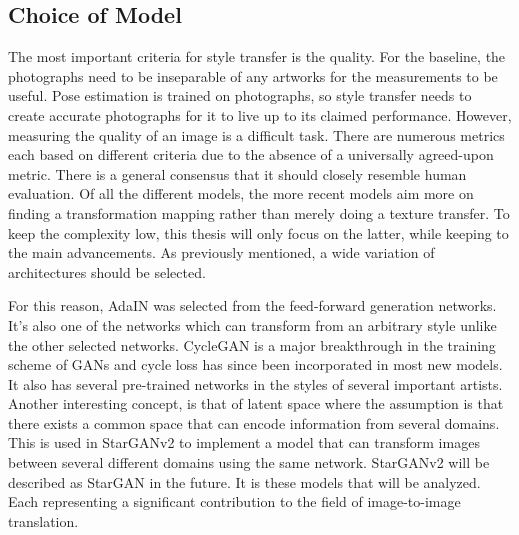 \subsection{Choice of Model}
\label{sec:baseline_choice_style_transfer}
The most important criteria for style transfer is the quality.
For the baseline, the photographs need to be inseparable of any artworks for the measurements to be useful.
Pose estimation is trained on photographs, so style transfer needs to create accurate photographs for it to live up to its claimed performance.
However, measuring the quality of an image is a difficult task.
There are numerous metrics each based on different criteria due to the absence of a universally agreed-upon metric. \cite{ioannou2024}
There is a general consensus that it should closely resemble human evaluation.
Of all the different models, the more recent models aim more on finding a transformation mapping rather than merely doing a texture transfer.
To keep the complexity low, this thesis will only focus on the latter, while keeping to the main advancements.
As previously mentioned, a wide variation of architectures should be selected.

For this reason, \gls{AdaIN} \cite{Huang2017} was selected from the feed-forward generation networks.
It's also one of the networks which can transform from an arbitrary style unlike the other selected networks.
CycleGAN \cite{Zhu2017} is a major breakthrough in the training scheme of \glspl{GAN} and cycle loss has since been incorporated in most new models.
It also has several pre-trained networks in the styles of several important artists.
Another interesting concept, is that of latent space where the assumption is that there exists a common space that can encode information from several domains. \cite{Liu2017}
This is used in StarGANv2 \cite{Choi2019} to implement a model that can transform images between several different domains using the same network.
StarGANv2 will be described as StarGAN in the future.
It is these models that will be analyzed.
Each representing a significant contribution to the field of image-to-image translation.
\\

